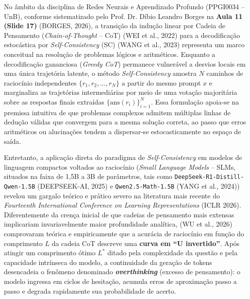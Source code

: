 \documentclass[9pt,conference]{IEEEtran}
\begin{document}
No \^{a}mbito da disciplina de Redes Neurais e Aprendizado Profundo (PPGI0034 -- UnB), conforme sistematizado pelo Prof. Dr. D\'{i}bio Leandro Borges na \textbf{Aula 11 (Slide 17)} (BORGES, 2026), a transi\c{c}\~{a}o da indu\c{c}\~{a}o linear por Cadeia de Pensamento (\textit{Chain-of-Thought} -- CoT) (WEI et al., 2022) para a decodifica\c{c}\~{a}o estoc\'{a}stica por \textit{Self-Consistency} (SC) (WANG et al., 2023) representa um marco conceitual na resolu\c{c}\~{a}o de problemas l\'{o}gicos e aritm\'{e}ticos. Enquanto a decodifica\c{c}\~{a}o gananciosa (\textit{Greedy CoT}) permanece vulner\'{a}vel a desvios locais em uma \'{u}nica trajet\'{o}ria latente, o m\'{e}todo \textit{Self-Consistency} amostra $N$ caminhos de racioc\'{i}nio independentes $\{r_1, r_2, \dots, r_N\}$ a partir do mesmo prompt $x$ e marginaliza as trajet\'{o}rias intermedi\'{a}rias por meio de uma vota\c{c}\~{a}o majorit\'{a}ria sobre as respostas finais extra\'{i}das $\{\text{ans}(r_i)\}_{i=1}^N$. Essa formula\c{c}\~{a}o apoia-se na premissa intuitiva de que problemas complexos admitem m\'{u}ltiplas linhas de dedu\c{c}\~{a}o v\'{a}lidas que convergem para a mesma solu\c{c}\~{a}o correta, ao passo que erros aritm\'{e}ticos ou alucina\c{c}\~{o}es tendem a dispersar-se estocasticamente no espa\c{c}o de sa\'{i}da.

Entretanto, a aplica\c{c}\~{a}o direta do paradigma de \textit{Self-Consistency} em modelos de linguagem compactos voltados ao racioc\'{i}nio (\textit{Small Language Models} -- SLMs, situados na faixa de 1,5B a 3B de par\^{a}metros, tais como \texttt{DeepSeek-R1-Distill-Qwen-1.5B} (DEEPSEEK-AI, 2025) e \texttt{Qwen2.5-Math-1.5B} (YANG et al., 2024)) revelou um gargalo te\'{o}rico e pr\'{a}tico severo na literatura mais recente do \textit{Fourteenth International Conference on Learning Representations} (ICLR 2026). Diferentemente da cren\c{c}a inicial de que cadeias de pensamento mais extensas implicariam invariavelmente maior profundidade anal\'{i}tica, (WU et al., 2026) comprovaram te\'{o}rica e empiricamente que a acur\'{a}cia de racioc\'{i}nio em fun\c{c}\~{a}o do comprimento $L$ da cadeia CoT descreve uma \textbf{curva em ``U invertido''}. Ap\'{o}s atingir um comprimento \'{o}timo $L^*$ ditado pela complexidade da quest\~{a}o e pela capacidade intr\'{i}nseca do modelo, a continuidade da gera\c{c}\~{a}o de tokens desencadeia o fen\^{o}meno denominado \textbf{\textit{overthinking}} (excesso de pensamento): o modelo ingressa em ciclos de hesita\c{c}\~{a}o, acumula erros de aproxima\c{c}\~{a}o passo a passo e degrada rapidamente sua probabilidade de acerto.
\end{document}
